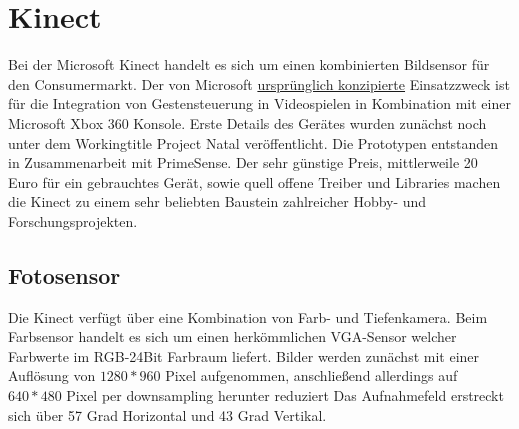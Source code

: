 	\section{Kinect}
	Bei der Microsoft Kinect handelt es sich um einen kombinierten Bildsensor für den Consumermarkt. Der von Microsoft \underline{ursprünglich konzipierte} Einsatzzweck ist für die Integration von Gestensteuerung in Videospielen in Kombination mit einer Microsoft Xbox 360 Konsole. Erste Details des Gerätes wurden zunächst noch unter dem Workingtitle Project Natal veröffentlicht. Die Prototypen entstanden in Zusammenarbeit mit PrimeSense. Der sehr günstige Preis, mittlerweile 20 Euro für ein gebrauchtes Gerät, sowie quell offene Treiber und Libraries machen die Kinect zu einem sehr beliebten Baustein zahlreicher Hobby- und Forschungsprojekten.
		\subsection{Fotosensor}
		Die Kinect verfügt über eine Kombination von Farb- und Tiefenkamera. Beim Farbsensor handelt es sich um einen herkömmlichen VGA-Sensor welcher Farbwerte im RGB-24Bit Farbraum liefert. Bilder werden zunächst mit einer Auflösung von $1280*960$ Pixel aufgenommen, anschließend allerdings auf $640*480$ Pixel per downsampling herunter reduziert Das Aufnahmefeld erstreckt sich über 57 Grad Horizontal und 43 Grad Vertikal.
			\cite{kinect-georg}
